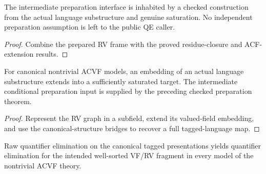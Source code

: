 \begin{theorem}

\label{preparation}


\leanok

The intermediate preparation interface is inhabited by a checked
construction from the actual language substructure and genuine saturation.
No independent preparation assumption is left to the public QE caller.

\end{theorem}

\begin{proof}


\leanok

Combine the prepared RV frame with the proved residue-closure and
ACF-extension results.

\end{proof}

\begin{theorem}

\label{rv-extension}


\leanok

For canonical nontrivial ACVF models, an embedding of an actual
language substructure extends into a sufficiently saturated target.
The intermediate conditional preparation input is supplied by the preceding
checked preparation theorem.

\end{theorem}

\begin{proof}


\leanok

Represent the RV graph in a subfield, extend its valued-field embedding,
and use the canonical-structure bridges to recover a full tagged-language map.

\end{proof}

\begin{theorem}

\label{sorting}


\leanok

Raw quantifier elimination on the canonical tagged presentations yields
quantifier elimination for the intended well-sorted VF/RV fragment in every
model of the nontrivial ACVF theory.

\end{theorem}

